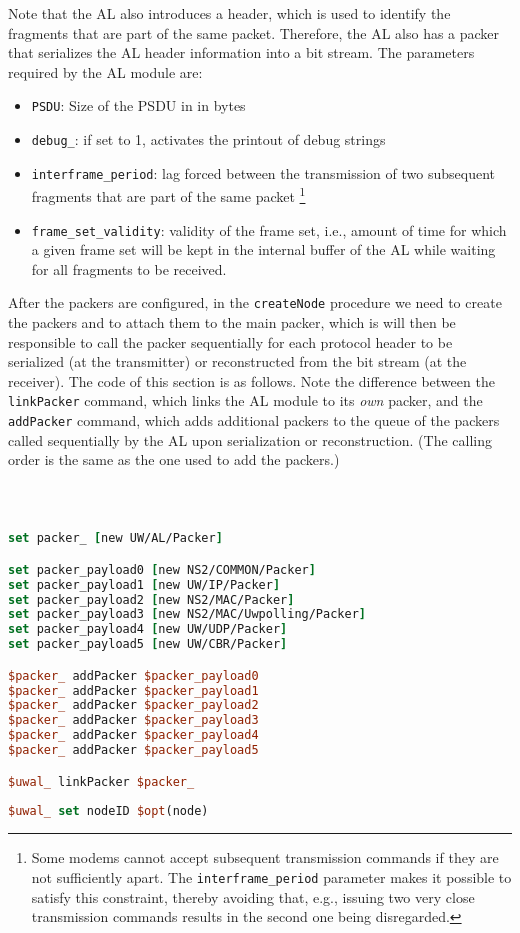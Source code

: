 \documentclass[11pt]{article}
\begin{document}
Note that the AL also introduces a header, which is used to identify the fragments that are part of the same packet. Therefore, the AL also has a packer that serializes the AL header information into a bit stream.
The parameters required by the AL module are:
\begin{itemize}
  \item  {\tt PSDU}: Size of the PSDU in in bytes
  \item  {\tt debug\_}: if set to 1, activates the printout of debug strings
  \item  {\tt interframe\_period}: lag forced between the transmission of two subsequent fragments that are part of the same packet%
  \footnote{Some modems cannot accept subsequent transmission commands if they are not sufficiently apart. The {\tt interframe\_period} parameter makes it possible to satisfy this constraint, thereby avoiding that, e.g., issuing two very close transmission commands results in the second one being disregarded.}
  \item  {\tt frame\_set\_validity}: validity of the frame set, i.e., amount of time for which a given frame set will be kept in the internal buffer of the AL while waiting for all fragments to be received.
\end{itemize}
After the packers are configured, in the {\tt createNode} procedure we need to create the packers and to attach them to the main packer, which is will then be responsible to call the packer sequentially for each protocol header to be serialized (at the transmitter) or reconstructed from the bit stream (at the receiver). The code of this section is as follows. Note the difference between the {\tt linkPacker} command, which links the AL module to its \emph{own} packer, and the {\tt addPacker} command, which adds additional packers to the queue of the packers called sequentially by the AL upon serialization or reconstruction. (The calling order is the same as the one used to add the packers.)

{\scriptsize\tt
\begin{lstlisting}[language=tcl]

set packer_ [new UW/AL/Packer]

set packer_payload0 [new NS2/COMMON/Packer]  
set packer_payload1 [new UW/IP/Packer]
set packer_payload2 [new NS2/MAC/Packer]
set packer_payload3 [new NS2/MAC/Uwpolling/Packer]
set packer_payload4 [new UW/UDP/Packer]
set packer_payload5 [new UW/CBR/Packer]

$packer_ addPacker $packer_payload0
$packer_ addPacker $packer_payload1
$packer_ addPacker $packer_payload2
$packer_ addPacker $packer_payload3
$packer_ addPacker $packer_payload4
$packer_ addPacker $packer_payload5

$uwal_ linkPacker $packer_
    
$uwal_ set nodeID $opt(node)
\end{lstlisting}
}
\end{document}
